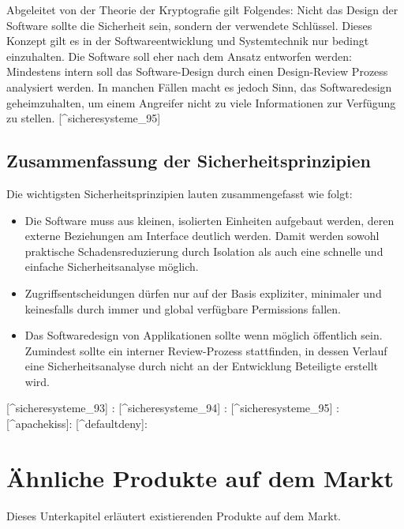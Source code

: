 Abgeleitet von der Theorie der Kryptografie gilt Folgendes: Nicht das
Design der Software sollte die Sicherheit sein, sondern der verwendete
Schlüssel. Dieses Konzept gilt es in der Softwareentwicklung und
Systemtechnik nur bedingt einzuhalten. Die Software soll eher nach dem
Ansatz entworfen werden: Mindestens intern soll das Software-Design
durch einen Design-Review Prozess analysiert werden. In manchen Fällen
macht es jedoch Sinn, das Softwaredesign geheimzuhalten, um einem
Angreifer nicht zu viele Informationen zur Verfügung zu stellen.
{[}\^{}sicheresysteme\_95{]}

\subsection{Zusammenfassung der
Sicherheitsprinzipien}\label{zusammenfassung-der-sicherheitsprinzipien}

Die wichtigsten Sicherheitsprinzipien lauten zusammengefasst wie folgt:

\begin{itemize}
\tightlist
\item
  Die Software muss aus kleinen, isolierten Einheiten aufgebaut werden,
  deren externe Beziehungen am Interface deutlich werden. Damit werden
  sowohl praktische Schadensreduzierung durch Isolation als auch eine
  schnelle und einfache Sicherheitsanalyse möglich.
\item
  Zugriffsentscheidungen dürfen nur auf der Basis expliziter, minimaler
  und keinesfalls durch immer und global verfügbare Permissions fallen.
\item
  Das Softwaredesign von Applikationen sollte wenn möglich öffentlich
  sein. Zumindest sollte ein interner Review-Prozess stattfinden, in
  dessen Verlauf eine Sicherheitsanalyse durch nicht an der Entwicklung
  Beteiligte erstellt wird.
\end{itemize}

{[}\^{}sicheresysteme\_93{]} : \autocite[ pp.93]{sicheresysteme}
{[}\^{}sicheresysteme\_94{]} :\autocite[ pp.94]{sicheresysteme}
{[}\^{}sicheresysteme\_95{]} :\autocite[ pp.95]{sicheresysteme}
{[}\^{}apachekiss{]}: \autocite{apachekiss} {[}\^{}defaultdeny{]}:
\autocite{defaultdeny}

\section{Ähnliche Produkte auf dem
Markt}\label{uxe4hnliche-produkte-auf-dem-markt}

Dieses Unterkapitel erläutert existierenden Produkte auf dem Markt.

